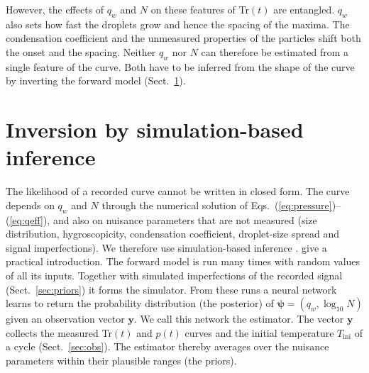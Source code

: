 \documentclass[preprint,review,12pt,authoryear]{elsarticle}
\begin{document}
However, the effects of $q_w$ and $N$ on these features of Tr$(t)$ are entangled. $q_w$ also sets how
fast the droplets grow and hence the spacing of the maxima. The condensation coefficient and the
unmeasured properties of the particles shift both the onset and the spacing. Neither $q_w$ nor $N$ can
therefore be estimated from a single feature of the curve. Both have to be inferred from the shape of
the curve by inverting the forward model (Sect.~\ref{sec:inversion}).


\section{Inversion by simulation-based inference}
\label{sec:inversion}
The likelihood of a recorded curve cannot be written in closed form. The curve depends on $q_w$ and $N$
through the numerical solution of Eqs.~(\ref{eq:pressure})--(\ref{eq:qeff}), and also on nuisance parameters
that are not measured (size distribution, hygroscopicity, condensation coefficient, droplet-size spread and
signal imperfections). We therefore use simulation-based inference \citep{cranmer2020frontier}.
\citet{deistler2025practical} give a practical introduction.
The forward model is run many times with random values of all its inputs. Together with simulated
imperfections of the recorded signal (Sect.~\ref{sec:priors}) it forms the simulator.
From these runs a neural network learns to return the probability distribution (the posterior) of
$\bm{\psi} = (q_w, \log_{10}N)$ given an observation vector $\bm{y}$. We call this network the
estimator. The vector $\bm{y}$ collects the
measured Tr$(t)$ and $p(t)$ curves and the initial temperature $T_\mathrm{ini}$ of a cycle
(Sect.~\ref{sec:obs}).
The estimator thereby averages over the nuisance parameters within their plausible ranges (the priors).
\end{document}
